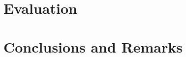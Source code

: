 \documentclass[logo,msc]{infthesis}           %
\begin{document}
\chapter{Evaluation}


\chapter{Conclusions and Remarks}






\appendix


\end{document}
